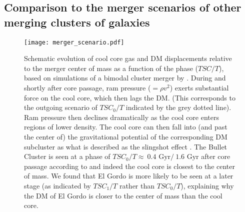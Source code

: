 \subsection{Comparison to the merger scenarios of other merging clusters of galaxies}

\begin{figure}
	\texttt{[image: merger\_scenario.pdf]}
 \caption{Schematic evolution of cool core gas and DM displacements relative to the
merger center of mass as a function of the phase ($TSC / T$), based on
simulations of a bimodal cluster merger by \citet{Mathis05}. During and
shortly after core passage, ram pressure ($=\rho v^2$) exerts substantial
force on the cool core, which then lags the DM. (This corresponds to the
outgoing scenario of $TSC_0 / T$ indicated by the grey dotted line). Ram
pressure then declines dramatically as the cool core enters regions of
lower density.  The cool core can then fall into (and past the center of)
the gravitational potential of the corresponding DM subcluster as what is
described as the slingshot effect \citep{Markevitch2007}.  The Bullet
Cluster is seen at a phase of $TSC_0 / T \approx ~0.4\text{ Gyr} / ~1.6
\text{ Gyr}$ after core passage according
to  and indeed the cool core is closest to the center of
mass. We found that El Gordo is more likely to be seen at a later stage (as
indicated by $TSC_1 / T$ rather than $TSC_0 / T$), explaining why the DM of
El Gordo is closer to the center of mass than the cool core. \label{fig:merger_scenario}}
\end{figure}
	
